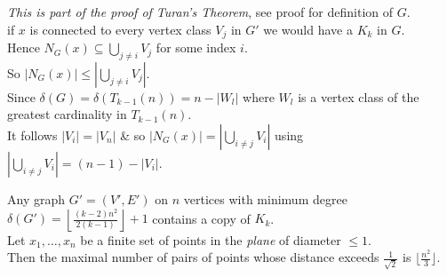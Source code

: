 \documentclass[11pt,a4paper]{article}
\begin{document}
\textit{This is part of the proof of Turan's Theorem}, see proof for definition of $G$.\\
if $x$ is connected to every vertex class $V_j$ in $G'$ we would have a $K_k$ in $G$.\\
Hence $N_G(x)\subseteq\bigcup_{j\neq i}V_j$ for some index $i$.\\
So $|N_G(x)|\leq\left|\bigcup\limits_{j\neq i}V_j\right|$.\\
Since $\delta(G)=\delta(T_{k-1}(n))=n-|W_l|$ where $W_l$ is a vertex class of the greatest cardinality in $T_{k-1}(n)$.\\
It follows $|V_i|=|V_n|$ \& so $|N_G(x)|=\left|\bigcup\limits_{i\neq j}V_i\right|$ using $\left|\bigcup\limits_{i\neq j}V_i\right|=(n-1)-|V_i|$.

\theorem{}
Any graph $G'=(V',E')$ on $n$ vertices with minimum degree $\delta(G')=\left\lfloor\frac{(k-2)n^2}{2(k-1)}\right\rfloor+1$ contains a copy of $K_k$.\\

Let $x_1,\dots,x_n$ be a finite set of points in the \textit{plane} of diameter $\leq 1$.\\
Then the maximal number of pairs of points whose distance exceeds $\frac{1}{\sqrt{2}}$ is $\lfloor\frac{n^2}{3}\rfloor$.\\
\end{document}
